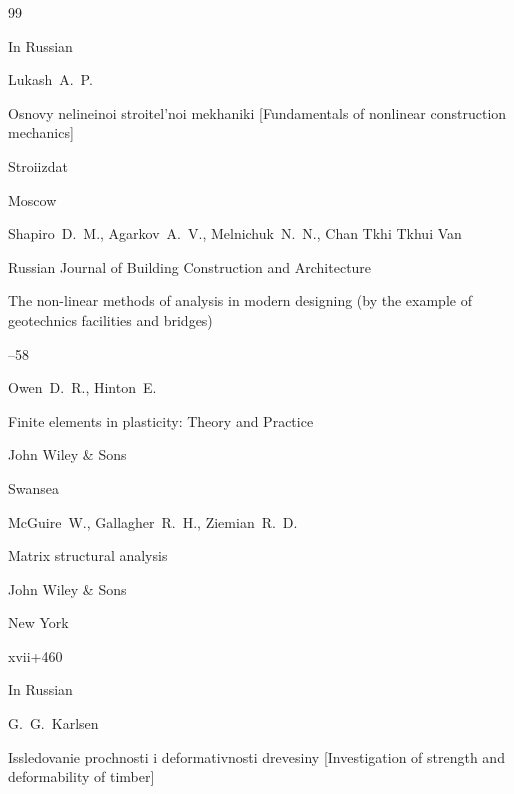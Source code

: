 \begin{thebibliography}{99}

\lang In Russian

\by Lukash~A.~P.

\book Osnovy nelineinoi stroitel'noi mekhaniki \rm [Fundamentals of nonlinear construction mechanics]


\publ Stroiizdat

\publaddr Moscow





\by Shapiro~D.~M., Agarkov~A.~V., Melnichuk~N.~N., Chan Tkhi Tkhui Van


\jour  Russian Journal of Building Construction and Architecture

\paper The non-linear methods of analysis in modern designing (by the example of geotechnics facilities and bridges)



--58




\by Owen~D.~R., Hinton~E.

\book Finite elements in plasticity: Theory and Practice


\publ John Wiley \& Sons

\publaddr Swansea





\by McGuire~W., Gallagher~R.~H., Ziemian~R.~D. 

\book Matrix structural analysis

\publ John Wiley \& Sons

\publaddr  New York


\totalpages xvii+460




\lang In Russian

\ed G.~G.~Karlsen  

\book Issledovanie prochnosti i deformativnosti drevesiny \rm [Investigation of strength and deformability of timber]


\end{thebibliography}
